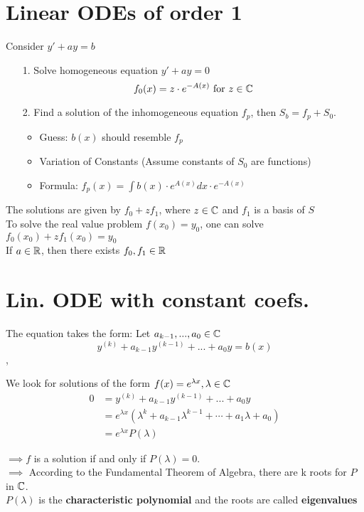 \section{Linear ODEs of order 1}
\Procedure Consider $y' + ay = b $
\begin{enumerate}
\item[1.] Solve homogeneous equation $y' + ay = 0$ 
\[ f_0(x) = z \cdot e^{-A(x)} \text{ for } z \in \mathbb{C}\]
\item[2.] Find a solution of the inhomogeneous equation $f_p$, then $S_b  = f_p + S_0$.
\begin{itemize}
  \item Guess: $b(x)$ should resemble $f_p$
  \item Variation of Constants (Assume constants of $S_0$ are functions)
  \item Formula: $f_p(x) = \int b(x) \cdot e^{A(x)} dx \cdot e^{-A(x)}$
\end{itemize}
\end{enumerate}
\Bem The solutions are given by $f_0 + z f_1$, where $z \in \mathbb{C}$ and $f_1$ is a basis of $S$ \\
\Bem To solve the real value problem $f(x_0) = y_0$, one can solve $f_0(x_0) + z f_1(x_0) = y_0$ \\
\Bem If $a \in \mathbb{R}$, then there exists $f_0, f_1 \in \mathbb{R}$ \\

\section{Lin. ODE with constant coefs. }
The equation takes the form: Let $a_{k - 1}, ..., a_0 \in \mathbb{C}$
\[ y^{(k)} + a_{k - 1} y^{(k - 1)} + ... + a_0 y = b(x) \] 
\sep

\Intuition We look for solutions of the form $f(x) = e^{\lambda x}, \lambda \in \mathbb{C}$
\begin{align*}
0 &=y^{(k)} + a_{k - 1} y^{(k - 1)} + ... + a_0 y \\
&=  e^{\lambda x}( \lambda^k + a_{k - 1} \lambda^{k - 1} + \cdots + a_1 \lambda + a_0) \\
&= e^{\lambda x} P(\lambda)
\end{align*}

$\implies f$ is a solution if and only if $P(\lambda) = 0$. \\
$\implies$ According to the Fundamental Theorem of Algebra, there are k roots for $P$ in $\mathbb{C}$. \\
\Bem $P(\lambda)$ is the \textbf{characteristic polynomial} and the roots are called \textbf{eigenvalues}\\


